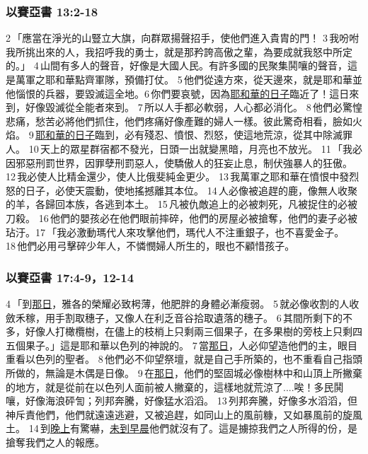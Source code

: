 \subsubsection{以賽亞書 13:2-18}
2 「應當在淨光的山豎立大旗，向群眾揚聲招手，使他們進入貴胄的門！ 3 我吩咐我所挑出來的人，我招呼我的勇士，就是那矜誇高傲之輩，為要成就我怒中所定的。」 4 山間有多人的聲音，好像是大國人民。有許多國的民聚集鬨嚷的聲音，這是萬軍之耶和華點齊軍隊，預備打仗。 5 他們從遠方來，從天邊來，就是耶和華並他惱恨的兵器，要毀滅這全地。6 你們要哀號，因為\underline{耶和華的日子}臨近了！這日來到，好像毀滅從全能者來到。 7 所以人手都必軟弱，人心都必消化。 8 他們必驚惶悲痛，愁苦必將他們抓住，他們疼痛好像產難的婦人一樣。彼此驚奇相看，臉如火焰。 9 \underline{耶和華的日子}臨到，必有殘忍、憤恨、烈怒，使這地荒涼，從其中除滅罪人。 10 天上的眾星群宿都不發光，日頭一出就變黑暗，月亮也不放光。 11 「我必因邪惡刑罰世界，因罪孽刑罰惡人，使驕傲人的狂妄止息，制伏強暴人的狂傲。 12 我必使人比精金還少，使人比俄斐純金更少。 13 我萬軍之耶和華在憤恨中發烈怒的日子，必使天震動，使地搖撼離其本位。 14 人必像被追趕的鹿，像無人收聚的羊，各歸回本族，各逃到本土。 15 凡被仇敵追上的必被刺死，凡被捉住的必被刀殺。 16 他們的嬰孩必在他們眼前摔碎，他們的房屋必被搶奪，他們的妻子必被玷汙。17 「我必激動瑪代人來攻擊他們，瑪代人不注重銀子，也不喜愛金子。 18 他們必用弓擊碎少年人，不憐憫婦人所生的，眼也不顧惜孩子。

\subsubsection{以賽亞書 17:4-9，12-14}
4 「到\underline{那日}，雅各的榮耀必致枵薄，他肥胖的身體必漸瘦弱。 5 就必像收割的人收斂禾稼，用手割取穗子，又像人在利乏音谷拾取遺落的穗子。 6 其間所剩下的不多，好像人打橄欖樹，在儘上的枝梢上只剩兩三個果子，在多果樹的旁枝上只剩四五個果子。」這是耶和華以色列的神說的。 7 當\underline{那日}，人必仰望造他們的主，眼目重看以色列的聖者。 8 他們必不仰望祭壇，就是自己手所築的，也不重看自己指頭所做的，無論是木偶是日像。 9 在\underline{那日}，他們的堅固城必像樹林中和山頂上所撇棄的地方，就是從前在以色列人面前被人撇棄的，這樣地就荒涼了....唉！多民鬨嚷，好像海浪砰訇；列邦奔騰，好像猛水滔滔。 13 列邦奔騰，好像多水滔滔，但神斥責他們，他們就遠遠逃避，又被追趕，如同山上的風前糠，又如暴風前的旋風土。 14 到\underline{晚上}有驚嚇，\underline{未到早晨}他們就沒有了。這是擄掠我們之人所得的份，是搶奪我們之人的報應。

